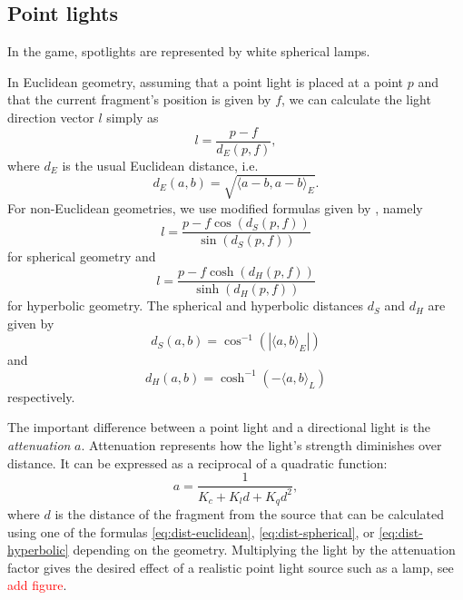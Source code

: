 \subsection{Point lights}
In the game, spotlights are represented by white spherical lamps.

In Euclidean geometry, assuming that a point light is placed at a point $p$ and that the current fragment's position is given by $f$, we can calculate the light direction vector $l$ simply as
\begin{equation*}
    l = \frac{p - f}{d_E(p, f)},
\end{equation*}
where $d_E$ is the usual Euclidean distance, i.e.
\begin{equation} \label{eq:dist-euclidean}
    d_E(a, b) = \sqrt{\langle a - b, a - b\rangle_E}.
\end{equation}
For non-Euclidean geometries, we use modified formulas given by \cite{Szirmay-Kalos2022}, namely
\begin{equation}
    l = \frac{p - f \cos(d_S(p, f))}{\sin(d_S(p, f))}
\end{equation}
for spherical geometry and
\begin{equation}
    l = \frac{p - f\cosh(d_H(p, f))}{\sinh(d_H(p, f))}
\end{equation}
for hyperbolic geometry.
The spherical and hyperbolic distances $d_S$ and $d_H$ are given by
\begin{equation} \label{eq:dist-spherical}
    d_S(a, b) = \cos^{-1}(|\langle a, b \rangle_E|)
\end{equation}
and
\begin{equation} \label{eq:dist-hyperbolic}
    d_H(a, b) = \cosh^{-1}(-\langle a, b \rangle_L)
\end{equation}
respectively.

The important difference between a point light and a directional light is the \textit{attenuation} $a$.
Attenuation represents how the light's strength diminishes over distance.
It can be expressed as a reciprocal of a quadratic function:
\begin{equation}
    a = \frac{1}{K_c + K_l d + K_q d^2},
\end{equation}
where $d$ is the distance of the fragment from the source that can be calculated using one of the formulas \ref{eq:dist-euclidean}, \ref{eq:dist-spherical}, or \ref{eq:dist-hyperbolic} depending on the geometry.
Multiplying the light by the attenuation factor gives the desired effect of a realistic point light source such as a lamp, see \textcolor{red}{add figure}.